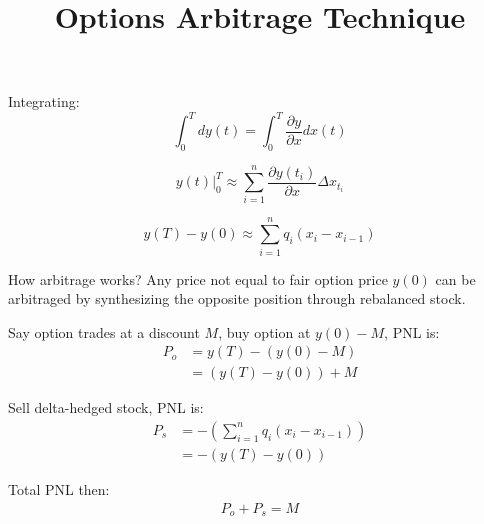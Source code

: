 \documentclass{article}
\begin{document}
\title{Options Arbitrage Technique}
\maketitle

Integrating:
\begin{equation}
    \int_{0}^{T} d y(t) = \int_{0}^{T} \frac{\partial y}{\partial x} dx(t)
\end{equation}

\begin{equation}
    y(t) \Big|_0^T \approx \sum_{i=1}^n \frac{\partial y(t_i)}{\partial x} \Delta x_{t_i}
\end{equation}

\begin{equation}
    y(T) - y(0) \approx \sum_{i=1}^n q_i \left( x_i - x_{i-1} \right)
\end{equation}

How arbitrage works? Any price not equal to fair option price $y(0)$ can be arbitraged by synthesizing the opposite position through rebalanced stock.

Say option trades at a discount $M$, buy option at $y(0) - M$, PNL is:
\begin{equation}
  \begin{aligned}
   P_o &= y(T) - \left( y(0) - M \right) \\
       &= ( y(T) - y(0) ) + M
  \end{aligned}
\end{equation}


Sell delta-hedged stock, PNL is:
\begin{equation}
  \begin{aligned}
   P_s & = - \left( \sum_{i=1}^n q_i (x_i - x_{i-1}) \right) \\
       & = - \left( y(T) - y(0) \right)
  \end{aligned}
\end{equation}

Total PNL then:
\begin{equation}
  \begin{aligned}
   P_o + P_s = M
  \end{aligned}
\end{equation}
\end{document}
